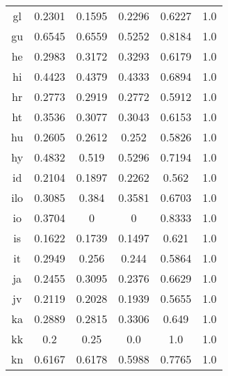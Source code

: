 \begin{figure}[h]
\begin{tabular}{cccccc}
gl&0.2301&0.1595&0.2296&0.6227&1.0\\
gu&0.6545&0.6559&0.5252&0.8184&1.0\\
he&0.2983&0.3172&0.3293&0.6179&1.0\\
hi&0.4423&0.4379&0.4333&0.6894&1.0\\
hr&0.2773&0.2919&0.2772&0.5912&1.0\\
ht&0.3536&0.3077&0.3043&0.6153&1.0\\
hu&0.2605&0.2612&0.252&0.5826&1.0\\
hy&0.4832&0.519&0.5296&0.7194&1.0\\
id&0.2104&0.1897&0.2262&0.562&1.0\\
ilo&0.3085&0.384&0.3581&0.6703&1.0\\
io&0.3704&0&0&0.8333&1.0\\
is&0.1622&0.1739&0.1497&0.621&1.0\\
it&0.2949&0.256&0.244&0.5864&1.0\\
ja&0.2455&0.3095&0.2376&0.6629&1.0\\
jv&0.2119&0.2028&0.1939&0.5655&1.0\\
ka&0.2889&0.2815&0.3306&0.649&1.0\\
kk&0.2&0.25&0.0&1.0&1.0\\
kn&0.6167&0.6178&0.5988&0.7765&1.0\\
\end{tabular}
\end{figure}
\clearpage
